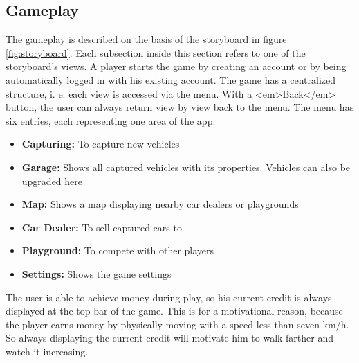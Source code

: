 \subsection{Gameplay}\label{sec:gameplay}
The gameplay is described on the basis of the storyboard in figure \ref{fig:storyboard}. Each subsection inside this section refers to one of the storyboard's views. A player starts the game by creating an account or by being automatically logged in with his existing account.
The game has a centralized structure, i. e. each view is accessed via the menu. With a <em>Back</em> button, the user can always return view by view back to the menu. The menu has six entries, each representing one area of the app:
\begin{itemize}
  \item\textbf{Capturing:} To capture new vehicles
  \item\textbf{Garage:} Shows all captured vehicles with its properties. Vehicles can also be upgraded here
  \item\textbf{Map:} Shows a map displaying nearby car dealers or playgrounds
  \item\textbf{Car Dealer:} To sell captured cars to
  \item\textbf{Playground:} To compete with other players
  \item\textbf{Settings:} Shows the game settings
\end{itemize}
The user is able to achieve money during play, so his current credit is always displayed at the top bar of the game. This is for a motivational reason, because the player earns money by physically moving with a speed less than seven km/h. So always displaying the current credit will motivate him to walk farther and watch it increasing.

